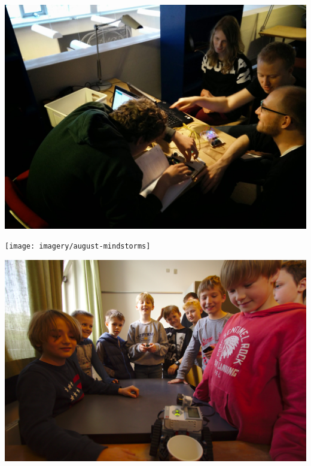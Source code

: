 \documentclass{beamer}
\begin{document}
\begin{frame}
 \vspace{5mm}
 \includegraphics[width=\textwidth]{imagery/arduino-workshop}
\end{frame}

\begin{frame}
 \vspace{5mm}
 \texttt{[image: imagery/august-mindstorms]}
\end{frame}

\begin{frame}
 \vspace{5mm}
 \includegraphics[width=\textwidth]{imagery/mindstorms-presentation}
\end{frame}
\end{document}
